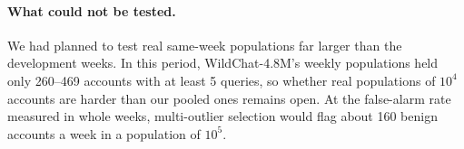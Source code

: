 \paragraph{What could not be tested.} We had planned to test real same-week populations far larger than the development weeks. In this period, WildChat-4.8M's weekly populations held only 260--469 accounts with at least 5 queries, so whether real populations of $10^4$ accounts are harder than our pooled ones remains open. At the false-alarm rate measured in whole weeks, multi-outlier selection would flag about 160 benign accounts a week in a population of $10^5$.

